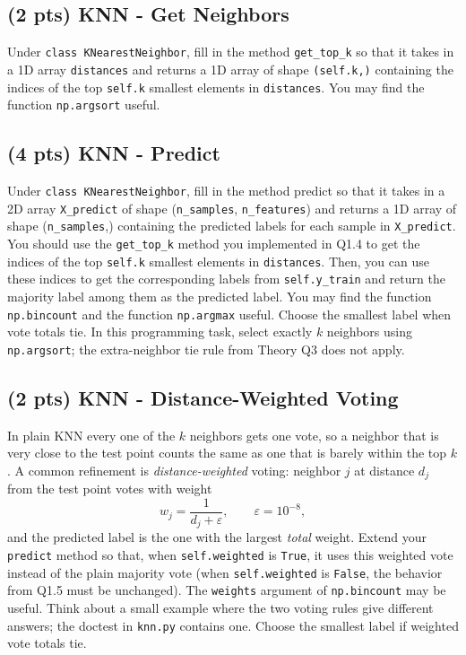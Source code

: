 \documentclass{article}
\begin{document}
\subsection{(2 pts) KNN - Get Neighbors}
Under \verb|class KNearestNeighbor|, fill in the method \verb|get_top_k| so that it takes in a 1D array \verb|distances| and
returns a 1D array of shape \verb|(self.k,)| containing the indices of the top \verb|self.k| smallest elements in
\verb|distances|. You may find the function \verb|np.argsort| useful.

\subsection{(4 pts) KNN - Predict}
Under \verb|class KNearestNeighbor|, fill in the method predict so that it takes in a 2D array \verb|X_predict| of shape
(\verb|n_samples|, \verb|n_features|) and returns a 1D array of shape (\verb|n_samples|,) containing the predicted labels for
each sample in \verb|X_predict|. You should use the \verb|get_top_k| method you implemented in Q1.4 to get the
indices of the top \verb|self.k| smallest elements in \verb|distances|. Then, you can use these indices to get the
corresponding labels from \verb|self.y_train| and return the majority label among them as the predicted label. You may find the
function \verb|np.bincount| and the function \verb|np.argmax| useful. Choose the smallest label when vote totals tie. In this programming task, select exactly $k$ neighbors using \verb|np.argsort|; the extra-neighbor tie rule from Theory Q3 does not apply.

\subsection{(2 pts) KNN - Distance-Weighted Voting}
In plain KNN every one of the $k$ neighbors gets one vote, so a neighbor that is very close to the test point counts the same as one that is barely within the top $k$. A common refinement is \emph{distance-weighted} voting: neighbor $j$ at distance $d_j$ from the test point votes with weight
\[
w_j = \frac{1}{d_j + \varepsilon}, \qquad \varepsilon = 10^{-8},
\]
and the predicted label is the one with the largest \emph{total} weight. Extend your \verb|predict| method so that, when \verb|self.weighted| is \verb|True|, it uses this weighted vote instead of the plain majority vote (when \verb|self.weighted| is \verb|False|, the behavior from Q1.5 must be unchanged). The \verb|weights| argument of \verb|np.bincount| may be useful. Think about a small example where the two voting rules give different answers; the doctest in \verb|knn.py| contains one. Choose the smallest label if weighted vote totals tie.
\end{document}
